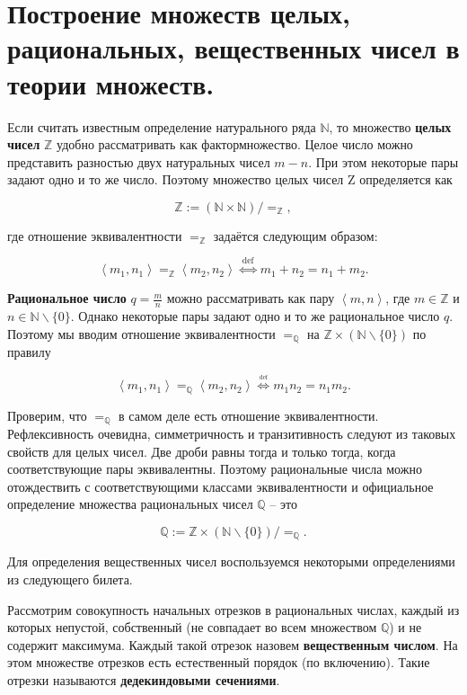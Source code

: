 \section{Построение множеств целых, рациональных, вещественных чисел в теории множеств.}

\begin{definition}
	Если считать известным определение натурального ряда $\mathbb{N}$, то множество \textbf{целых чисел} $\mathbb{Z}$
	удобно рассматривать как фактормножество. Целое число можно представить разностью двух натуральных чисел $m-n$.
	При этом некоторые пары задают одно и то же число. Поэтому множество целых чисел Z определяется как

	$$
	\mathbb{Z}:=(\mathbb{N} \times \mathbb{N}) /=_{\mathbb{Z}},
	$$

	где отношение эквивалентности $=_{\mathbb{Z}}$ задаётся следующим образом:

	$$
	\left\langle m_{1}, n_{1}\right\rangle=_{\mathbb{Z}}\left\langle m_{2}, n_{2}\right\rangle \stackrel{\text { def
	}}{\Longleftrightarrow} m_{1}+n_{2}=n_{1}+m_{2}.
	$$
\end{definition}

\begin{definition}
	\textbf{Рациональное число} $q = \frac{m}{n}$ можно рассматривать как пару $\left\langle m, n\right\rangle$, где $m
	\in \mathbb{Z}$ и $n \in \mathbb{N} \backslash \{0\}$. Однако некоторые пары задают одно и то же рациональное
	число $q$. Поэтому мы вводим отношение эквивалентности $=_{\mathbb{Q}}$ на $\mathbb{Z} \times(\mathbb{N}
	\backslash\{0\})$ по правилу

	$$
	\left\langle m_1, n_1 \right \rangle=_{\mathbb{Q}} \left \langle m_{2}, n_{2}\right \rangle
	\overset{\underset{\mathrm{def}}{}}{\Longleftrightarrow} m_{1} n_{2}=n_{1} m_{2}.
	$$

	Проверим, что $=_{\mathbb{Q}}$ в самом деле есть отношение эквивалентности. Рефлексивность очевидна, симметричность
	и транзитивность следуют из таковых свойств для целых чисел. Две дроби равны тогда и только тогда, когда
	соответствующие пары эквивалентны. Поэтому рациональные числа можно отождествить с соответствующими классами
	эквивалентности и официальное определение множества рациональных чисел $\mathbb{Q}$ -- это

	$$
	\mathbb{Q}:=\mathbb{Z} \times(\mathbb{N} \backslash\{0\}) /=_{\mathbb{Q}}.
	$$
\end{definition}

Для определения вещественных чисел воспользуемся некоторыми определениями из следующего билета.

\begin{definition}
	Рассмотрим совокупность начальных отрезков в рациональных числах, каждый из которых непустой, собственный (не
	совпадает во всем множеством $\mathbb{Q}$) и не содержит максимума. Каждый такой отрезок назовем
	\textbf{вещественным числом}. На этом множестве отрезков есть естественный порядок (по включению). Такие
	отрезки называются \textbf{дедекиндовыми сечениями}.
\end{definition}
